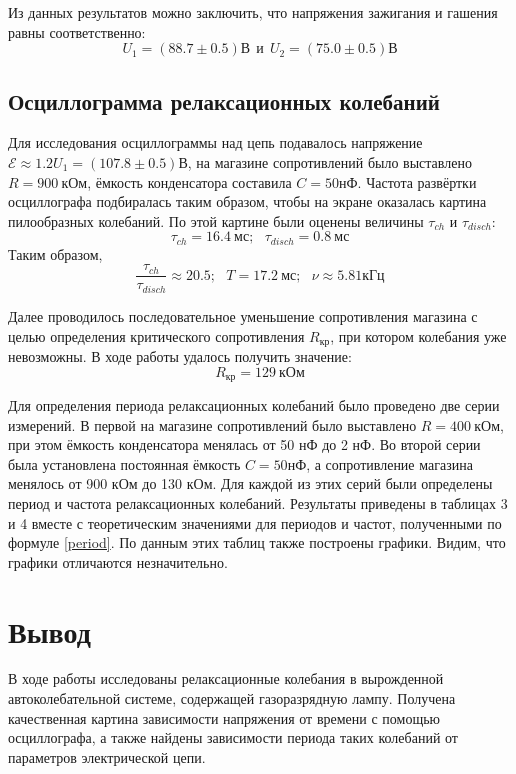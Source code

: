 \documentclass[14pt, a4paper,reqno]{article}
\begin{document}
    Из данных результатов можно заключить, что напряжения зажигания и гашения равны соответственно:
    \[U_1 = (88.7 \pm 0.5) В\ \ и\ \ U_2 = (75.0 \pm 0.5) В\]

    \subsection{Осциллограмма релаксационных колебаний}

    Для исследования осциллограммы над цепь подавалось напряжение $\mathcal{E} \approx 1.2 U_1 = (107.8 \pm 0.5) В$,
    на магазине сопротивлений было выставлено $R = 900\ кОм$, ёмкость конденсатора составила $C = 50 нФ$. 
    Частота развёртки осциллографа подбиралась таким образом, чтобы на экране оказалась картина пилообразных колебаний. 
    По этой картине были оценены величины $\tau_{ch}$ и $\tau_{disch}$:
    \[\tau_{ch} = 16.4\ мс;\ \ \ \tau_{disch} = 0.8\ мс\]
    Таким образом,  
    \[\frac{\tau_{ch}}{\tau_{disch}} \approx 20.5; \ \ \ T = 17.2\ мс; \ \ \ \nu \approx 5.81 кГц\]

    Далее проводилось последовательное уменьшение сопротивления магазина с целью определения критического
    сопротивления $R_{кр}$, при котором колебания уже невозможны. В ходе работы удалось получить значение:
    \[R_{кр} = 129\ кОм\]

    Для определения периода релаксационных колебаний было проведено две серии измерений. В первой на магазине
    сопротивлений было выставлено $R = 400\ кОм$, при этом ёмкость конденсатора менялась от 50 нФ до 2 нФ. Во
    второй серии была установлена постоянная ёмкость $C = 50 нФ$, а сопротивление магазина менялось от 900 кОм
    до 130 кОм. Для каждой из этих серий были определены период и частота релаксационных колебаний. Результаты
    приведены в таблицах 3 и 4 вместе с теоретическим значениями для периодов и частот, полученными по формуле
    \eqref{period}. По данным этих таблиц также построены графики. Видим, что графики отличаются незначительно.

\section{Вывод}

    В ходе работы исследованы релаксационные колебания в вырожденной автоколебательной системе, содержащей
    газоразрядную лампу. Получена качественная картина зависимости напряжения от времени с помощью осциллографа,
    а также найдены зависимости периода таких колебаний от параметров электрической цепи.
\end{document}
